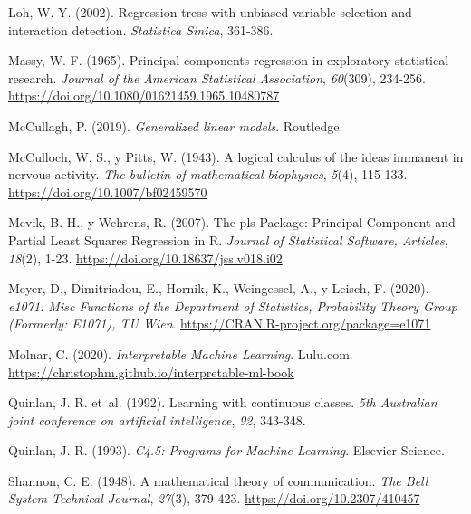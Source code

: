 \documentclass[
]{book}
\newlength{\cslhangindent}
\newlength{\cslentryspacingunit} %
\newenvironment{CSLReferences}[2] %
 {%
  \setlength{\parindent}{0pt}
  \ifodd #1
  \let\oldpar\par
  \def\par{\hangindent=\cslhangindent\oldpar}
  \fi
  \setlength{\parskip}{#2\cslentryspacingunit}
 }%
 {}
\theoremstyle{break}
\theoremstyle{nonumberplain}
\begin{document}
\begin{CSLReferences}{1}{0}
\leavevmode{}%
Loh, W.-Y. (2002). Regression tress with unbiased variable selection and interaction detection. \emph{Statistica Sinica}, 361-386.

\leavevmode{}%
Massy, W. F. (1965). Principal components regression in exploratory statistical research. \emph{Journal of the American Statistical Association}, \emph{60}(309), 234-256. \url{https://doi.org/10.1080/01621459.1965.10480787}

\leavevmode{}%
McCullagh, P. (2019). \emph{Generalized linear models}. Routledge.

\leavevmode{}%
McCulloch, W. S., y Pitts, W. (1943). A logical calculus of the ideas immanent in nervous activity. \emph{The bulletin of mathematical biophysics}, \emph{5}(4), 115-133. \url{https://doi.org/10.1007/bf02459570}

\leavevmode{}%
Mevik, B.-H., y Wehrens, R. (2007). The pls Package: Principal Component and Partial Least Squares Regression in R. \emph{Journal of Statistical Software, Articles}, \emph{18}(2), 1-23. \url{https://doi.org/10.18637/jss.v018.i02}

\leavevmode{}%
Meyer, D., Dimitriadou, E., Hornik, K., Weingessel, A., y Leisch, F. (2020). \emph{e1071: Misc Functions of the Department of Statistics, Probability Theory Group (Formerly: E1071), TU Wien}. \url{https://CRAN.R-project.org/package=e1071}

\leavevmode{}%
Molnar, C. (2020). \emph{Interpretable Machine Learning}. Lulu.com. \url{https://christophm.github.io/interpretable-ml-book}

\leavevmode{}%
Quinlan, J. R. et~al. (1992). Learning with continuous classes. \emph{5th Australian joint conference on artificial intelligence}, \emph{92}, 343-348.

\leavevmode{}%
Quinlan, J. R. (1993). \emph{C4.5: Programs for Machine Learning}. Elsevier Science.

\leavevmode{}%
Shannon, C. E. (1948). A mathematical theory of communication. \emph{The Bell System Technical Journal}, \emph{27}(3), 379-423. \url{https://doi.org/10.2307/410457}


\end{CSLReferences}
\end{document}
